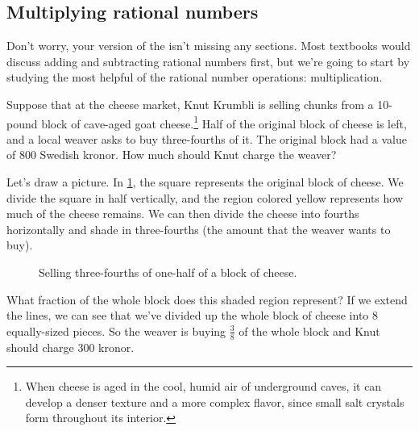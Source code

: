 \subsection{Multiplying rational numbers}

Don't worry, your version of the \algebranomicon{} isn't missing any sections. Most textbooks would discuss adding and subtracting rational numbers first, but we're going to start by studying the most helpful of the rational number operations: multiplication.

Suppose that at the cheese market, Knut Krumbli is selling chunks from a 10-pound block of cave-aged goat cheese.\footnote{When cheese is aged in the cool, humid air of underground caves, it can develop a denser texture and a more complex flavor, since small salt crystals form throughout its interior.} Half of the original block of cheese is left, and a local weaver asks to buy three-fourths of it. The original block had a value of 800 Swedish kronor. How much should Knut charge the weaver?

Let's draw a picture. In \cref{fig:fracmult}, the square represents the original block of cheese. We divide the square in half vertically, and the region colored yellow represents how much of the cheese remains. We can then divide the cheese into fourths horizontally and shade in three-fourths (the amount that the weaver wants to buy).

\begin{figure}[!htbp]
\centering
{}
\caption{Selling three-fourths of one-half of a block of cheese.}
\label{fig:fracmult}
\end{figure}

What fraction of the whole block does this shaded region represent? If we extend the lines, we can see that we've divided up the whole block of cheese into 8 equally-sized pieces. So the weaver is buying $\frac{3}{8}$ of the whole block and Knut should charge 300 kronor.

